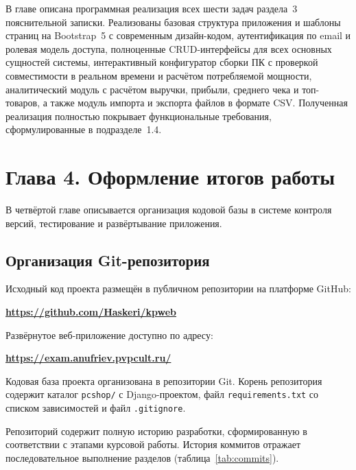 \documentclass[14pt, a4paper]{extarticle}
\begin{document}
В главе описана программная реализация всех шести задач раздела~3 пояснительной записки. Реализованы базовая структура приложения и шаблоны страниц на Bootstrap~5 с современным дизайн-кодом, аутентификация по email и ролевая модель доступа, полноценные CRUD-интерфейсы для всех основных сущностей системы, интерактивный конфигуратор сборки ПК с проверкой совместимости в реальном времени и расчётом потребляемой мощности, аналитический модуль с расчётом выручки, прибыли, среднего чека и топ-товаров, а также модуль импорта и экспорта файлов в формате CSV. Полученная реализация полностью покрывает функциональные требования, сформулированные в подразделе~1.4.

\section*{Глава 4. Оформление итогов работы}

В четвёртой главе описывается организация кодовой базы в системе контроля версий, тестирование и развёртывание приложения.

\subsection{Организация Git-репозитория}

Исходный код проекта размещён в публичном репозитории на платформе GitHub:

\begin{center}
\textbf{\url{https://github.com/Haskeri/kpweb}}
\end{center}

Развёрнутое веб-приложение доступно по адресу:

\begin{center}
\textbf{\url{https://exam.anufriev.pvpcult.ru/}}
\end{center}

Кодовая база проекта организована в репозитории Git. Корень репозитория содержит каталог \texttt{pcshop/} с Django-проектом, файл \texttt{requirements.txt} со списком зависимостей и файл \texttt{.gitignore}.

Репозиторий содержит полную историю разработки, сформированную в соответствии с этапами курсовой работы. История коммитов отражает последовательное выполнение разделов (таблица~\ref{tab:commits}).
\end{document}
